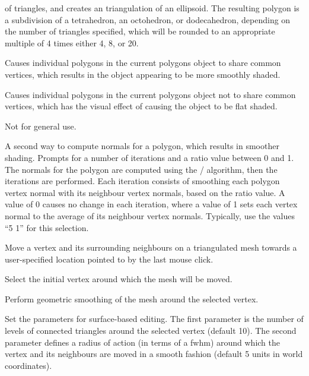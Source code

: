 \documentclass[11pt,letterpaper]{article}
\newcommand{\menutwo}[2]{{\scriptsize \fbox{\bf #1}/\fbox{\bf #2}}}
\begin{document}
\begin{description}
     of triangles, and creates an triangulation of an ellipsoid.  The
     resulting polygon is a subdivision of a tetrahedron, an octohedron,
     or dodecahedron, depending on the number of triangles specified, which
     will be rounded to an appropriate multiple of 4 times either 4, 8, or 20.
\item[\menutwo{Polygons}{Coalesce Polygons}]  Causes individual polygons in
     the current polygons object to share common vertices, which results in
     the object appearing to be more smoothly shaded.
\item[\menutwo{Polygons}{Separate Polygons}]  Causes individual polygons in
     the current polygons object not to share common vertices, which has
     the visual effect of causing the object to be flat shaded.
\item[\menutwo{Polygons}{Smooth Polygon}]  Not for general use.
\item[\menutwo{Polygons}{Average Normals}]  A second way to compute
     normals for a polygon, which results in smoother shading.
     Prompts for a number of
     iterations and a ratio value between 0 and 1.  The normals for the
     polygon are computed using the \menutwo{Polygons}{Compute Normals}
     algorithm, then the iterations are performed.  Each
     iteration consists of smoothing each polygon vertex normal with
     its neighbour vertex normals, based on the ratio value.  A value
     of 0 causes no change in each iteration, where a value of 1
     sets each vertex normal to the average of its neighbour vertex
     normals.  Typically, use the values ``5 1'' for this selection.
\item[\menutwo{Polygons}{Move Vertex}] Move a vertex and its surrounding 
neighbours on a triangulated mesh towards a user-specified location pointed
to by the last mouse click.
\item[\menutwo{Polygons}{Nearest Vertex}] Select the initial vertex
 around which the mesh will be moved.
\item[\menutwo{Polygons}{Smooth Around Vertex}] Perform geometric
  smoothing of the mesh around the selected vertex.
\item[\menutwo{Polygons}{Vector Surface Params}] Set the parameters for
 surface-based editing. The first parameter is the number of levels
 of connected triangles around the selected vertex (default 10). The
 second parameter defines a radius of action (in terms of a fwhm)
 around which the vertex and its neighbours are moved in a smooth
 fashion (default 5 units in world coordinates).

\end{description}
\end{document}
